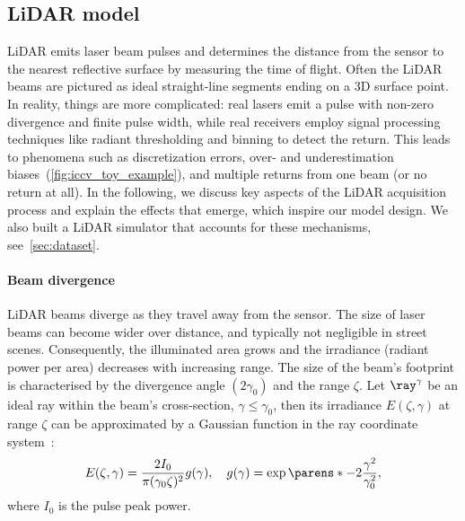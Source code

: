 \subsection{LiDAR model}
\label{sec:lidar_model}

LiDAR emits laser beam pulses and determines the distance from the sensor to the nearest reflective surface by measuring the time of flight. 
Often the LiDAR beams are pictured as ideal straight-line segments ending on a 3D surface point. In reality, things are more complicated: real lasers emit a pulse with non-zero divergence and finite pulse width, while real receivers employ signal processing techniques like radiant thresholding and binning to detect the return. This leads to phenomena such as discretization errors, over- and underestimation biases~(\cf \cref{fig:iccv_toy_example}), and multiple returns from one beam (or no return at all). 
In the following, we discuss key aspects of the LiDAR acquisition process and explain the effects that emerge, which inspire our model design. We also built a LiDAR simulator that accounts for these mechanisms, see~\cref{sec:dataset}.


\paragraph{Beam divergence}
LiDAR beams diverge as they travel away from the sensor. The size of laser beams can become wider over distance, and typically not negligible in street scenes. Consequently, the illuminated area grows and the irradiance (radiant power per area) decreases with increasing range.
The size of the beam's footprint is characterised by the divergence angle $(2\gamma_0)$ and the range $\zeta$. Let $\ray^{\gamma}$ be an ideal ray within the beam's cross-section, $\gamma \leq \gamma_0$, then its irradiance $E(\zeta, \gamma)$ at range $\zeta$ can be approximated by a Gaussian function in the ray coordinate system~\cite{wagner2006gaussian}:
\begin{equation}
    E(\zeta, \gamma) =\frac{2I_0}{\pi (\gamma_0 \zeta)^2} g(\gamma), \quad g(\gamma) = \exp\parens*{-2 \frac{\gamma^2}{\gamma_0^2}},
\end{equation}
where $I_0$ is the pulse peak power. %


